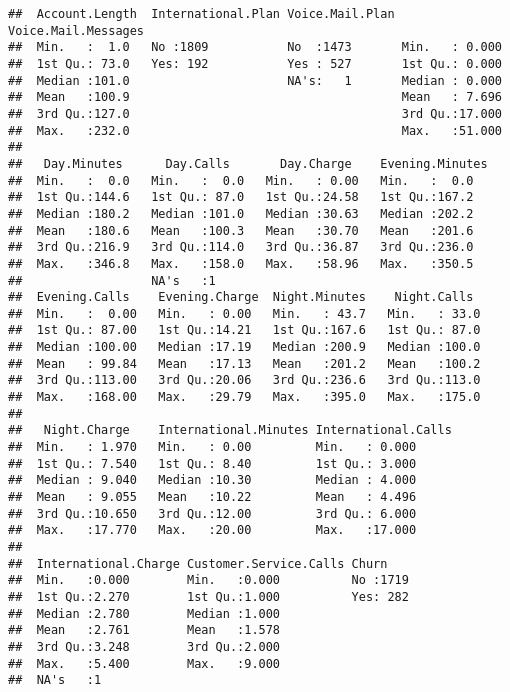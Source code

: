 \documentclass[]{article}
\begin{document}
\begin{verbatim}
##  Account.Length  International.Plan Voice.Mail.Plan Voice.Mail.Messages
##  Min.   :  1.0   No :1809           No  :1473       Min.   : 0.000     
##  1st Qu.: 73.0   Yes: 192           Yes : 527       1st Qu.: 0.000     
##  Median :101.0                      NA's:   1       Median : 0.000     
##  Mean   :100.9                                      Mean   : 7.696     
##  3rd Qu.:127.0                                      3rd Qu.:17.000     
##  Max.   :232.0                                      Max.   :51.000     
##                                                                        
##   Day.Minutes      Day.Calls       Day.Charge    Evening.Minutes
##  Min.   :  0.0   Min.   :  0.0   Min.   : 0.00   Min.   :  0.0  
##  1st Qu.:144.6   1st Qu.: 87.0   1st Qu.:24.58   1st Qu.:167.2  
##  Median :180.2   Median :101.0   Median :30.63   Median :202.2  
##  Mean   :180.6   Mean   :100.3   Mean   :30.70   Mean   :201.6  
##  3rd Qu.:216.9   3rd Qu.:114.0   3rd Qu.:36.87   3rd Qu.:236.0  
##  Max.   :346.8   Max.   :158.0   Max.   :58.96   Max.   :350.5  
##                  NA's   :1                                      
##  Evening.Calls    Evening.Charge  Night.Minutes    Night.Calls   
##  Min.   :  0.00   Min.   : 0.00   Min.   : 43.7   Min.   : 33.0  
##  1st Qu.: 87.00   1st Qu.:14.21   1st Qu.:167.6   1st Qu.: 87.0  
##  Median :100.00   Median :17.19   Median :200.9   Median :100.0  
##  Mean   : 99.84   Mean   :17.13   Mean   :201.2   Mean   :100.2  
##  3rd Qu.:113.00   3rd Qu.:20.06   3rd Qu.:236.6   3rd Qu.:113.0  
##  Max.   :168.00   Max.   :29.79   Max.   :395.0   Max.   :175.0  
##                                                                  
##   Night.Charge    International.Minutes International.Calls
##  Min.   : 1.970   Min.   : 0.00         Min.   : 0.000     
##  1st Qu.: 7.540   1st Qu.: 8.40         1st Qu.: 3.000     
##  Median : 9.040   Median :10.30         Median : 4.000     
##  Mean   : 9.055   Mean   :10.22         Mean   : 4.496     
##  3rd Qu.:10.650   3rd Qu.:12.00         3rd Qu.: 6.000     
##  Max.   :17.770   Max.   :20.00         Max.   :17.000     
##                                                            
##  International.Charge Customer.Service.Calls Churn     
##  Min.   :0.000        Min.   :0.000          No :1719  
##  1st Qu.:2.270        1st Qu.:1.000          Yes: 282  
##  Median :2.780        Median :1.000                    
##  Mean   :2.761        Mean   :1.578                    
##  3rd Qu.:3.248        3rd Qu.:2.000                    
##  Max.   :5.400        Max.   :9.000                    
##  NA's   :1
\end{verbatim}
\end{document}
